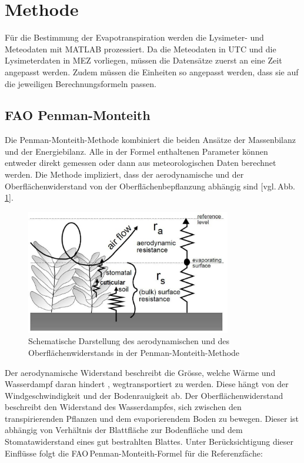 \section{Methode}

Für die Bestimmung der Evapotranspiration werden die Lysimeter- und Meteodaten mit MATLAB prozessiert. Da die Meteodaten in UTC und die Lysimeterdaten in MEZ vorliegen, müssen die Datensätze zuerst an eine Zeit angepasst werden. Zudem müssen die Einheiten so angepasst werden, dass sie auf die jeweiligen Berechnungsformeln passen.

\subsection{FAO Penman-Monteith}

Die Penman-Monteith-Methode kombiniert die beiden Ansätze der Massenbilanz und der Energiebilanz. Alle in der Formel enthaltenen Parameter können entweder direkt gemessen oder dann aus meteorologischen Daten berechnet werden. Die Methode impliziert, dass der aerodynamische und der Oberflächenwiderstand von der Oberflächenbepflanzung abhängig sind [vgl.\,Abb.\,\ref{fig:widerstand}]. 

\begin{figure}[H]
\centering
\includegraphics[width=0.8\textwidth]{figures/penman_widerstand.jpg}
\caption{Schematische Darstellung des aerodynamischen und des Oberflächenwiderstands in der Penman-Monteith-Methode}
\label{fig:widerstand}
\end{figure}

Der aerodynamische Widerstand beschreibt die Grösse, welche Wärme und Wasserdampf daran hindert , wegtransportiert zu werden. Diese hängt von der Windgeschwindigkeit und der Bodenrauigkeit ab. Der Oberflächenwiderstand beschreibt den Widerstand des Wasserdampfes, sich zwischen den transpirierenden Pflanzen und dem evaporierendem Boden zu bewegen. Dieser ist abhängig von Verhältnis der Blattfläche zur Bodenfläche und dem Stomatawiderstand eines gut bestrahlten Blattes. Unter Berücksichtigung dieser Einflüsse folgt die FAO\,Penman-Monteith-Formel für die Referenzfäche:

